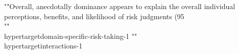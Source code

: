 {{{{{{{{{{{{{{{{{{{{{{{{{""Overall, anecdotally dominance appears to explain the overall individual perceptions, benefits, and likelihood of risk judgments (95\\%
""\\hypertarget{domain-specific-risk-taking-1}{%
""\\hypertarget{interactions-1}{%
}}}}}}}}}}}}}}}}}}}}}}}}}}}
